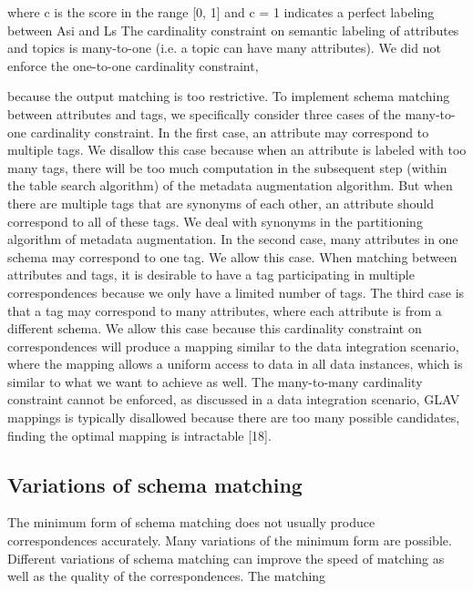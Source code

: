 where c is the score in the range [0, 1] and c = 1 indicates a perfect labeling between Asi and Ls
The cardinality constraint on semantic labeling of attributes and topics is many-to-one (i.e. a topic can have many attributes). We did not enforce the one-to-one cardinality constraint,

because the output matching is too restrictive. To implement schema matching between attributes and tags, we specifically consider three cases of the many-to-one cardinality constraint.
In the first case, an attribute may correspond to multiple tags. We disallow this case because when an attribute is labeled with too many tags, there will be too much computation in the subsequent step (within the table search algorithm) of the metadata augmentation algorithm. But when there are multiple tags that are synonyms of each other, an attribute should correspond to all of these tags. We deal with synonyms in the partitioning algorithm of metadata augmentation. In the second case, many attributes in one schema may correspond to one tag. We allow this case. When matching between attributes and tags, it is desirable to have a tag participating in multiple correspondences because we only have a limited number of tags. The third case is that a tag may correspond to many attributes, where each attribute is from a different schema. We allow this case because this cardinality constraint on correspondences will produce a mapping similar to the data integration scenario, where the mapping allows a uniform access to data in all data instances, which is similar to what we want to achieve as well. The many-to-many cardinality constraint cannot be enforced, as discussed in a data integration scenario, GLAV mappings is typically disallowed because there are too many possible candidates, finding the optimal mapping is intractable \cite{Ehrig2004QOM}[18].

\subsection{Variations of schema matching}
\label{ssec:VariationsOfSchemaMatching}

The minimum form of schema matching does not usually produce correspondences accurately. Many variations of the minimum form are possible. Different variations of schema matching can improve the speed of matching as well as the quality of the correspondences. The matching

